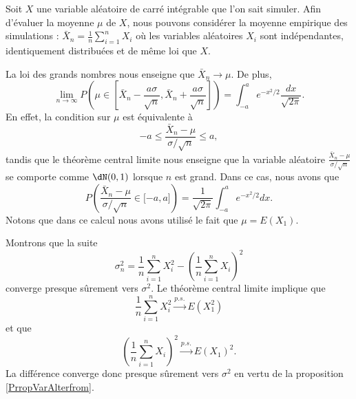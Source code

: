 \begin{example}
    Soit \( X\) une variable aléatoire de carré intégrable que l'on sait simuler. Afin d'évaluer la moyenne \( \mu\) de \( X\), nous pouvons considérer la moyenne empirique des simulations : \( \bar X_n=\frac{1}{ n }\sum_{i=1}^nX_i\) où les variables aléatoires \( X_i\) sont indépendantes, identiquement distribuées et de même loi que \( X\). 

    La loi des grands nombres nous enseigne que \( \bar X_n\to\mu\). De plus,
    \begin{equation}
        \lim_{n\to \infty} P\left( \mu\in\left[ \bar X_n-\frac{ a\sigma }{ \sqrt{n} },\bar X_n+\frac{ a\sigma }{ \sqrt{n} } \right] \right)=\int_{-a}^a e^{-x^2/2}\frac{ dx }{ \sqrt{2\pi} }.
    \end{equation}
    En effet, la condition sur \( \mu\) est équivalente à
    \begin{equation}
        -a\leq \frac{ \bar X_n-\mu }{ \sigma/\sqrt{n} }\leq a,
    \end{equation}
    tandis que le théorème central limite nous enseigne que la variable aléatoire \( \frac{ \bar X_n-\mu }{ \sigma/\sqrt{n} }\) se comporte comme \( \dN(0,1)\) lorsque \( n\) est grand. Dans ce cas, nous avons que
    \begin{equation}
        P\left( \frac{ \bar X_n-\mu }{ \sigma/\sqrt{n} }\in\mathopen[ -a , a \mathclose] \right)=\frac{1}{ \sqrt{2\pi} }\int_{-a}^a e^{-x^2/2}dx.
    \end{equation}
    Notons que dans ce calcul nous avons utilisé le fait que \( \mu=E(X_1)\).

    Montrons que la suite
    \begin{equation}
        \sigma_n^2=\frac{1}{ n }\sum_{i=1}^nX_i^2-\left( \frac{1}{ n }\sum_{i=1}^nX_i \right)^2
    \end{equation}
    converge presque sûrement vers \( \sigma^2\). Le théorème central limite implique que
    \begin{equation}
        \frac{1}{ n }\sum_{i=1}^nX_i^2\stackrel{p.s.}{\longrightarrow} E(X_1^2)
    \end{equation}
    et que
    \begin{equation}
        \left( \frac{1}{ n }\sum_{i=1}^nX_i \right)^2\stackrel{p.s.}{\longrightarrow}E(X_1)^2.
    \end{equation}
    La différence converge donc presque sûrement vers \( \sigma^2\) en vertu de la proposition \ref{PrropVarAlterfrom}.


\end{example}
